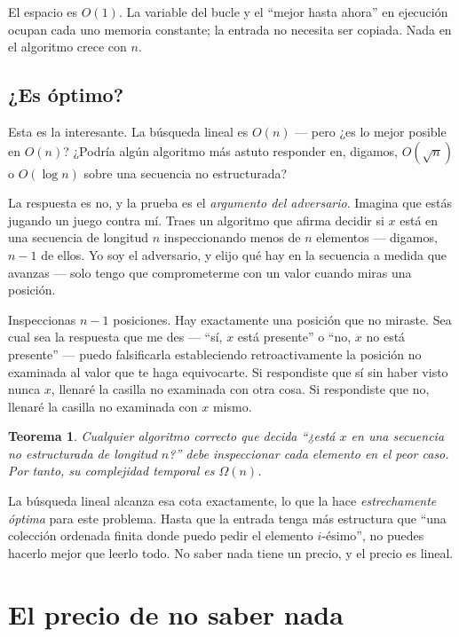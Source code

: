 \documentclass[11pt,a4paper]{article}
\newtheorem{teorema}{Teorema}
\begin{document}
El espacio es $O(1)$. La variable del bucle y el ``mejor hasta ahora'' en ejecución ocupan cada uno memoria constante; la entrada no necesita ser copiada. Nada en el algoritmo crece con $n$.

\subsection*{¿Es óptimo?}

Esta es la interesante. La búsqueda lineal es $O(n)$ --- pero ¿es lo mejor posible en $O(n)$? ¿Podría algún algoritmo más astuto responder en, digamos, $O(\sqrt{n})$ o $O(\log n)$ sobre una secuencia no estructurada?

La respuesta es no, y la prueba es el \emph{argumento del adversario}. Imagina que estás jugando un juego contra mí. Traes un algoritmo que afirma decidir si $x$ está en una secuencia de longitud $n$ inspeccionando menos de $n$ elementos --- digamos, $n-1$ de ellos. Yo soy el adversario, y elijo qué hay en la secuencia a medida que avanzas --- solo tengo que comprometerme con un valor cuando miras una posición.

Inspeccionas $n-1$ posiciones. Hay exactamente una posición que no miraste. Sea cual sea la respuesta que me des --- ``sí, $x$ está presente'' o ``no, $x$ no está presente'' --- puedo falsificarla estableciendo retroactivamente la posición no examinada al valor que te haga equivocarte. Si respondiste que sí sin haber visto nunca $x$, llenaré la casilla no examinada con otra cosa. Si respondiste que no, llenaré la casilla no examinada con $x$ mismo.

\begin{teorema}
Cualquier algoritmo correcto que decida ``¿está $x$ en una secuencia no estructurada de longitud $n$?'' debe inspeccionar cada elemento en el peor caso. Por tanto, su complejidad temporal es $\Omega(n)$.
\end{teorema}

La búsqueda lineal alcanza esa cota exactamente, lo que la hace \emph{estrechamente óptima} para este problema. Hasta que la entrada tenga más estructura que ``una colección ordenada finita donde puedo pedir el elemento $i$-ésimo'', no puedes hacerlo mejor que leerlo todo. No saber nada tiene un precio, y el precio es lineal.

\section{El precio de no saber nada}
\end{document}
